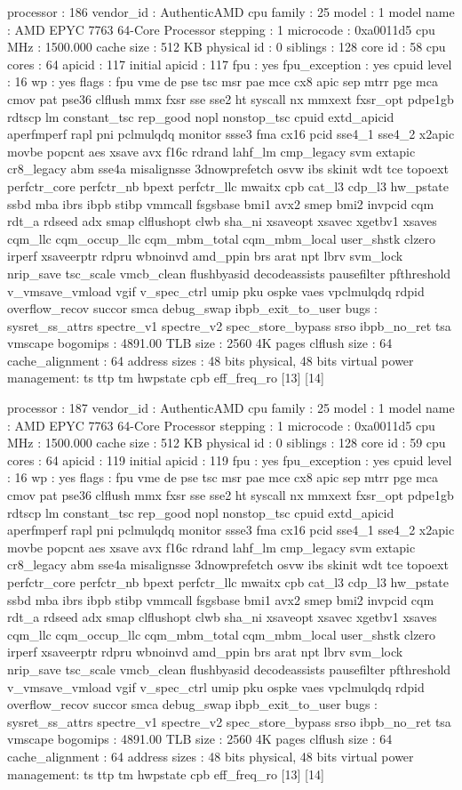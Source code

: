 processor	: 186
vendor_id	: AuthenticAMD
cpu family	: 25
model		: 1
model name	: AMD EPYC 7763 64-Core Processor
stepping	: 1
microcode	: 0xa0011d5
cpu MHz		: 1500.000
cache size	: 512 KB
physical id	: 0
siblings	: 128
core id		: 58
cpu cores	: 64
apicid		: 117
initial apicid	: 117
fpu		: yes
fpu_exception	: yes
cpuid level	: 16
wp		: yes
flags		: fpu vme de pse tsc msr pae mce cx8 apic sep mtrr pge mca cmov pat pse36 clflush mmx fxsr sse sse2 ht syscall nx mmxext fxsr_opt pdpe1gb rdtscp lm constant_tsc rep_good nopl nonstop_tsc cpuid extd_apicid aperfmperf rapl pni pclmulqdq monitor ssse3 fma cx16 pcid sse4_1 sse4_2 x2apic movbe popcnt aes xsave avx f16c rdrand lahf_lm cmp_legacy svm extapic cr8_legacy abm sse4a misalignsse 3dnowprefetch osvw ibs skinit wdt tce topoext perfctr_core perfctr_nb bpext perfctr_llc mwaitx cpb cat_l3 cdp_l3 hw_pstate ssbd mba ibrs ibpb stibp vmmcall fsgsbase bmi1 avx2 smep bmi2 invpcid cqm rdt_a rdseed adx smap clflushopt clwb sha_ni xsaveopt xsavec xgetbv1 xsaves cqm_llc cqm_occup_llc cqm_mbm_total cqm_mbm_local user_shstk clzero irperf xsaveerptr rdpru wbnoinvd amd_ppin brs arat npt lbrv svm_lock nrip_save tsc_scale vmcb_clean flushbyasid decodeassists pausefilter pfthreshold v_vmsave_vmload vgif v_spec_ctrl umip pku ospke vaes vpclmulqdq rdpid overflow_recov succor smca debug_swap ibpb_exit_to_user
bugs		: sysret_ss_attrs spectre_v1 spectre_v2 spec_store_bypass srso ibpb_no_ret tsa vmscape
bogomips	: 4891.00
TLB size	: 2560 4K pages
clflush size	: 64
cache_alignment	: 64
address sizes	: 48 bits physical, 48 bits virtual
power management: ts ttp tm hwpstate cpb eff_freq_ro [13] [14]

processor	: 187
vendor_id	: AuthenticAMD
cpu family	: 25
model		: 1
model name	: AMD EPYC 7763 64-Core Processor
stepping	: 1
microcode	: 0xa0011d5
cpu MHz		: 1500.000
cache size	: 512 KB
physical id	: 0
siblings	: 128
core id		: 59
cpu cores	: 64
apicid		: 119
initial apicid	: 119
fpu		: yes
fpu_exception	: yes
cpuid level	: 16
wp		: yes
flags		: fpu vme de pse tsc msr pae mce cx8 apic sep mtrr pge mca cmov pat pse36 clflush mmx fxsr sse sse2 ht syscall nx mmxext fxsr_opt pdpe1gb rdtscp lm constant_tsc rep_good nopl nonstop_tsc cpuid extd_apicid aperfmperf rapl pni pclmulqdq monitor ssse3 fma cx16 pcid sse4_1 sse4_2 x2apic movbe popcnt aes xsave avx f16c rdrand lahf_lm cmp_legacy svm extapic cr8_legacy abm sse4a misalignsse 3dnowprefetch osvw ibs skinit wdt tce topoext perfctr_core perfctr_nb bpext perfctr_llc mwaitx cpb cat_l3 cdp_l3 hw_pstate ssbd mba ibrs ibpb stibp vmmcall fsgsbase bmi1 avx2 smep bmi2 invpcid cqm rdt_a rdseed adx smap clflushopt clwb sha_ni xsaveopt xsavec xgetbv1 xsaves cqm_llc cqm_occup_llc cqm_mbm_total cqm_mbm_local user_shstk clzero irperf xsaveerptr rdpru wbnoinvd amd_ppin brs arat npt lbrv svm_lock nrip_save tsc_scale vmcb_clean flushbyasid decodeassists pausefilter pfthreshold v_vmsave_vmload vgif v_spec_ctrl umip pku ospke vaes vpclmulqdq rdpid overflow_recov succor smca debug_swap ibpb_exit_to_user
bugs		: sysret_ss_attrs spectre_v1 spectre_v2 spec_store_bypass srso ibpb_no_ret tsa vmscape
bogomips	: 4891.00
TLB size	: 2560 4K pages
clflush size	: 64
cache_alignment	: 64
address sizes	: 48 bits physical, 48 bits virtual
power management: ts ttp tm hwpstate cpb eff_freq_ro [13] [14]


